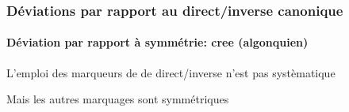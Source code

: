 \begin{frame}
\frametitle{Déviations par rapport au direct/inverse canonique}
\framesubtitle{Déviation par rapport à symmétrie: cree (algonquien)}
\begin{smallwideitemize}
\item L'emploi des marqueurs de de direct/inverse n'est pas systèmatique
\item Mais les autres marquages sont symmétriques
\end{smallwideitemize}
\begin{table}[h]
\caption{Plains Cree present paradigms. TA  ``see" and IA ``run" (\cite{wolfart73})}\label{tab:cree.tr} \centering
{}
\end{table}
\end{frame}
